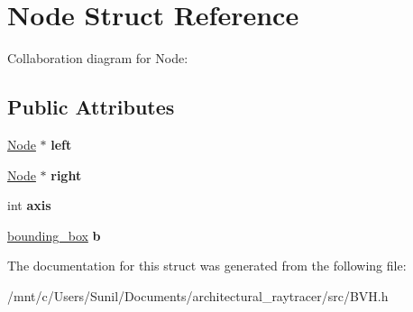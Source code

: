 \hypertarget{structNode}{}\section{Node Struct Reference}
\label{structNode}


Collaboration diagram for Node\+:
\subsection*{Public Attributes}
\begin{DoxyCompactItemize}
\item 
\mbox{\label{structNode_ab8c667ac8fdb120ed4c031682a9cdaee}} 
\hyperlink{structNode}{Node} $\ast$ {\bfseries left}
\item 
\mbox{\label{structNode_a7328862eaa6dea28018326549b3294d3}} 
\hyperlink{structNode}{Node} $\ast$ {\bfseries right}
\item 
\mbox{\label{structNode_a042a2ed715392b0279b12947310493ec}} 
int {\bfseries axis}
\item 
\mbox{\label{structNode_aed4c4a2caff0c37dacb07c65dec95ccd}} 
\hyperlink{classbounding__box}{bounding\+\_\+box} {\bfseries b}
\end{DoxyCompactItemize}


The documentation for this struct was generated from the following file\+:\begin{DoxyCompactItemize}
\item 
/mnt/c/\+Users/\+Sunil/\+Documents/architectural\+\_\+raytracer/src/B\+V\+H.\+h\end{DoxyCompactItemize}
